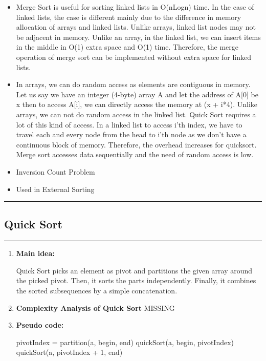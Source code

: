 \documentclass[11pt,a4paper]{article}
\begin{document}
{\begin{enumerate}[label=\textbf{\arabic*})]
\begin{itemize}
						\item Merge Sort is useful for sorting linked lists in O(nLogn) time. In the case of linked lists, the case is different mainly due to the difference in memory allocation of arrays and linked lists. Unlike arrays, linked list nodes may not be adjacent in memory. Unlike an array, in the linked list, we can insert items in the middle in O(1) extra space and O(1) time. Therefore, the merge operation of merge sort can be implemented without extra space for linked lists.
						\item In arrays, we can do random access as elements are contiguous in memory. Let us say we have an integer (4-byte) array A and let the address of A[0] be x then to access A[i], we can directly access the memory at (x + i*4). Unlike arrays, we can not do random access in the linked list. Quick Sort requires a lot of this kind of access. In a linked list to access i’th index, we have to travel each and every node from the head to i’th node as we don’t have a continuous block of memory. Therefore, the overhead increases for quicksort. Merge sort accesses data sequentially and the need of random access is low.
						\item Inversion Count Problem
						\item Used in External Sorting
					\end{itemize}
			\end{enumerate}
		
		\rule{15cm}{0.1cm}
		\subsection{Quick Sort}
		\rule{15cm}{0.1cm}
			\begin{enumerate}[label=\textbf{\arabic*})]
				\item \textbf{Main idea:}
				
					Quick Sort picks an element as pivot and partitions the given array around the picked pivot. Then, it sorts the parts independently. Finally, it combines the sorted subsequences by a simple concatenation.
				\\[12pt]
				\item \textbf{Complexity Analysis of Quick Sort}
					MISSING
				\\[12pt]
				\item \textbf{Pseudo code:} 
				\begin{algorithm}
            	\begin{algorithmic}[1]
            			\State pivotIndex = partition(a, begin, end)
            			\State quickSort(a, begin, pivotIndex)
            			\State quickSort(a, pivotIndex + 1, end)
            		\EndProcedure
            		

\end{algorithmic}
\end{algorithm}
\end{enumerate}}
\end{document}
